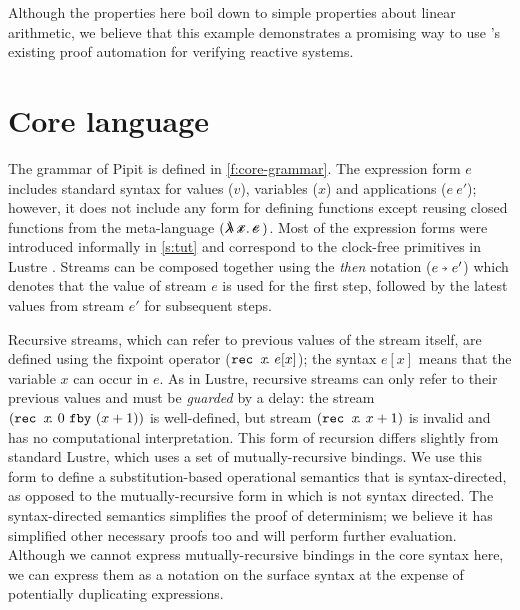 \documentclass[sigplan,screen, review]{acmart}
\begin{document}
Although the properties here boil down to simple properties about linear arithmetic, we believe that this example demonstrates a promising way to use \fstar{}'s existing proof automation for verifying reactive systems.

\section{Core language}
\label{s:core}


% 
% 

The grammar of Pipit is defined in \autoref{f:core-grammar}.
The expression form $e$ includes standard syntax for values ($v$), variables ($x$) and applications ($e~e'$); however, it does not include any form for defining functions except reusing closed functions from the \fstar{} meta-language $(\mlamX{})$.
Most of the expression forms were introduced informally in \autoref{s:tut} and correspond to the clock-free primitives in Lustre \cite{caspi1995functional}.
Streams can be composed together using the \emph{then} notation ($\xthen{e}{e'}$) which denotes that the value of stream $e$ is used for the first step, followed by the latest values from stream $e'$ for subsequent steps.

Recursive streams, which can refer to previous values of the stream itself, are defined using the fixpoint operator ($\texttt{rec~} x \!.~e[x]$); the syntax $e[x]$ means that the variable $x$ can occur in $e$.
As in Lustre, recursive streams can only refer to their previous values and must be \emph{guarded} by a delay: the stream $(\texttt{rec~} x \!.~0~\texttt{fby}~(x + 1))$ is well-defined, but stream $(\texttt{rec~} x \!.~x + 1)$ is invalid and has no computational interpretation.
This form of recursion differs slightly from standard Lustre, which uses a set of mutually-recursive bindings.
We use this form to define a substitution-based operational semantics that is syntax-directed, as opposed to the mutually-recursive form in \citet{caspi1995functional} which is not syntax directed.
The syntax-directed semantics simplifies the proof of determinism; we believe it has simplified other necessary proofs too and will perform further evaluation.
Although we cannot express mutually-recursive bindings in the core syntax here, we can express them as a notation on the surface syntax at the expense of potentially duplicating expressions.
\end{document}
